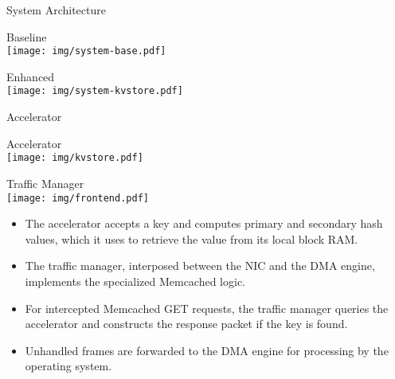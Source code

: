 \begin{block}{System Architecture}
\begin{multicols}{2}
\centering
\alert{Baseline} \\[0.5\baselineskip]
\texttt{[image: img/system-base.pdf]}

\columnbreak

\centering
\alert{Enhanced} \\[0.5\baselineskip]
\texttt{[image: img/system-kvstore.pdf]}
\end{multicols}
\end{block}

\vspace{1ex}

\begin{block}{Accelerator}
\footnotesize

\begin{multicols}{2}
\begin{center}
    \alert{Accelerator} \\[0.5\baselineskip]
    \texttt{[image: img/kvstore.pdf]}
\end{center}

\columnbreak

\begin{center}
    \alert{Traffic Manager} \\[0.5\baselineskip]
    \texttt{[image: img/frontend.pdf]}
\end{center}

\end{multicols}

\begin{itemize}
    \item The accelerator accepts a key and computes primary and secondary
        hash values, which it uses to retrieve the value from its local
        block RAM.
    \item The traffic manager, interposed between the NIC and the DMA
        engine, implements the specialized Memcached logic.
    \item For intercepted Memcached GET requests, the traffic manager queries the
	accelerator and constructs the response packet if the key is found.
    \item Unhandled frames are forwarded to the DMA engine for processing
	by the operating system.
\end{itemize}
\end{block}

\vspace{1ex}

